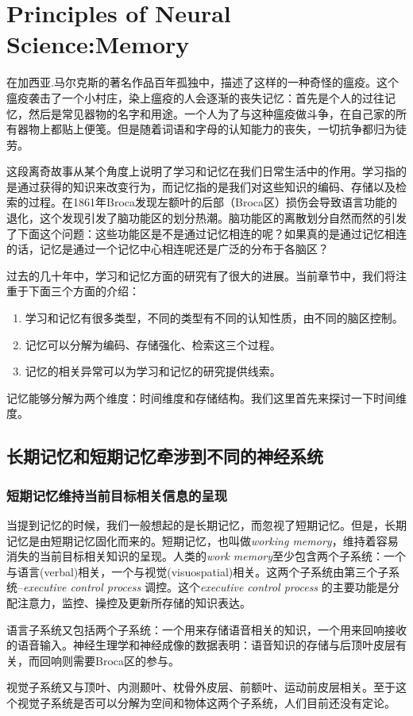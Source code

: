 \documentclass[UTF8,nofonts]{ctexart}
\date{\today}
\begin{document}
\newpage
\vspace{1cm}
\section{Principles of Neural Science:Memory}
在加西亚.马尔克斯的著名作品百年孤独中，描述了这样的一种奇怪的瘟疫。这个瘟疫袭击了一个小村庄，染上瘟疫的人会逐渐的丧失记忆：首先是个人的过往记忆，然后是常见器物的名字和用途。一个人为了与这种瘟疫做斗争，在自己家的所有器物上都贴上便笺。但是随着词语和字母的认知能力的丧失，一切抗争都归为徒劳。
\par
这段离奇故事从某个角度上说明了学习和记忆在我们日常生活中的作用。学习指的是通过获得的知识来改变行为，而记忆指的是我们对这些知识的编码、存储以及检索的过程。在1861年Broca发现左额叶的后部（Broca区）损伤会导致语言功能的退化，这个发现引发了脑功能区的划分热潮。脑功能区的离散划分自然而然的引发了下面这个问题：这些功能区是不是通过记忆相连的呢？如果真的是通过记忆相连的话，记忆是通过一个记忆中心相连呢还是广泛的分布于各脑区？
\par
过去的几十年中，学习和记忆方面的研究有了很大的进展。当前章节中，我们将注重于下面三个方面的介绍：
\begin{enumerate}
\item 学习和记忆有很多类型，不同的类型有不同的认知性质，由不同的脑区控制。
\item 记忆可以分解为编码、存储强化、检索这三个过程。
\item 记忆的相关异常可以为学习和记忆的研究提供线索。
\end{enumerate}
记忆能够分解为两个维度：时间维度和存储结构。我们这里首先来探讨一下时间维度。
\subsection{长期记忆和短期记忆牵涉到不同的神经系统}
\subsubsection{短期记忆维持当前目标相关信息的呈现}
当提到记忆的时候，我们一般想起的是长期记忆，而忽视了短期记忆。但是，长期记忆是由短期记忆固化而来的。短期记忆，也叫做\textit{working memory}，维持着容易消失的当前目标相关知识的呈现。人类的\textit{work memory}至少包含两个子系统：一个与语言(verbal)相关，一个与视觉(visuospatial)相关。这两个子系统由第三个子系统--\textit{executive control process} 调控。这个\textit{executive control process} 的主要功能是分配注意力，监控、操控及更新所存储的知识表达。
\par
语言子系统又包括两个子系统：一个用来存储语音相关的知识，一个用来回响接收的语音输入。神经生理学和神经成像的数据表明：语音知识的存储与后顶叶皮层有关，而回响则需要Broca区的参与。
\par
视觉子系统又与顶叶、内测颞叶、枕骨外皮层、前额叶、运动前皮层相关。至于这个视觉子系统是否可以分解为空间和物体这两个子系统，人们目前还没有定论。
\end{document}
